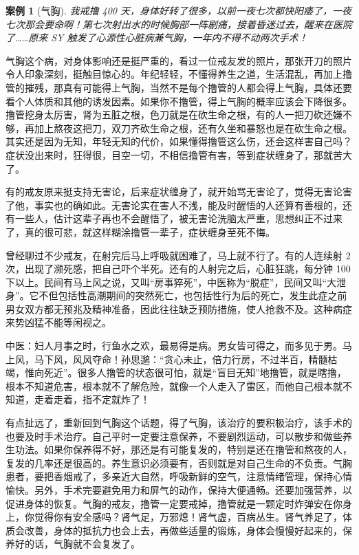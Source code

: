 \documentclass{ctexart}
\newtheorem{case}{案例}
\begin{document}
\begin{case}[气胸]
    我戒撸 400 天，身体好转了很多，以前一夜七次都快阳痿了，一夜七次那会要命啊！第七次射出水的时候胸部一阵剧痛，接着昏迷过去，醒来在医院了……原来 SY 触发了心源性心脏病兼气胸，一年内不得不动两次手术！
\end{case}

气胸这个病，对身体影响还是挺严重的，看过一位戒友发的照片，那张开刀的照片令人印象深刻，挺触目惊心的。年纪轻轻，不懂得养生之道，生活混乱，再加上撸管的摧残，那真有可能得上气胸，当然不是每个撸管的人都会得上气胸，具体还要看个人体质和其他的诱发因素。如果你不撸管，得上气胸的概率应该会下降很多。撸管挖身太厉害，肾为五脏之根，色刀就是在砍生命之根，有的人一把刀砍还嫌不够，再加上熬夜这把刀，双刀齐砍生命之根，还有久坐和暴怒也是在砍生命之根。其实还是因为无知，年轻无知的代价，如果懂得撸管这么伤，还会这样害自己吗？症状没出来时，狂得很，目空一切，不相信撸管有害，等到症状缠身了，那就苦大了。

有的戒友原来挺支持无害论，后来症状缠身了，就开始骂无害论了，觉得无害论害了他，事实也的确如此。无害论实在害人不浅，能及时醒悟的人还算有善根的，还有一些人，估计这辈子再也不会醒悟了，被无害论洗脑太严重，思想纠正不过来了，真的很可悲，就这样糊涂撸管一辈子，症状缠身至死不悔。

曾经聊过不少戒友，在射完后马上呼吸就困难了，马上就不行了。有的人连续射 2 次，出现了濒死感，把自己吓个半死。还有的人射完之后，心脏狂跳，每分钟 100 下以上。民间有马上风之说，又叫“房事猝死”，中医称为“脱症”，民间又叫“大泄身”。它不但包括性高潮期间的突然死亡，也包括性行为后的死亡，发生此症之前男女双方都无预兆及精神准备，因此往往缺乏预防措施，使人抢救不及。这种病症来势凶猛不能等闲视之。

中医：妇人月事之时，行鱼水之欢，最易得是病。男女皆可得之，而多见于男。马上风，马下风，风风夺命！孙思邈：“贪心未止，倍力行房，不过半百，精髓枯竭，惟向死近”。很多人撸管的状态很可怕，就是“盲目无知”地撸管，就是瞎撸，根本不知道危害，根本就不了解危险，就像一个人走入了雷区，而他自己根本就不知道，走着走着，指不定就炸了！

有点扯远了，重新回到气胸这个话题，得了气胸，该治疗的要积极治疗，该手术的也要及时手术治疗。自己平时一定要注意保养，不要剧烈运动，可以散步和做些养生功法。如果你保养得不好，那还是有可能复发的，特别是还在撸管和熬夜的人，复发的几率还是很高的。养生意识必须要有，否则就是对自己生命的不负责。气胸患者，要把香烟戒了，多亲近大自然，呼吸新鲜的空气，注意情绪管理，保持心情愉快。另外，手术完要避免用力和屏气的动作，保持大便通畅。还要加强营养，以促进身体的恢复。气胸的戒友，撸管一定要戒掉，撸管就是一颗定时炸弹安在你身上，你觉得你有安全感吗？肾气足，万邪熄！肾气虚，百病丛生。肾气养足了，体质会改善，身体的抵抗力也会上去，再做些适量的锻炼，身体会慢慢好起来的，保养好的话，气胸就不会复发了。
\end{document}
